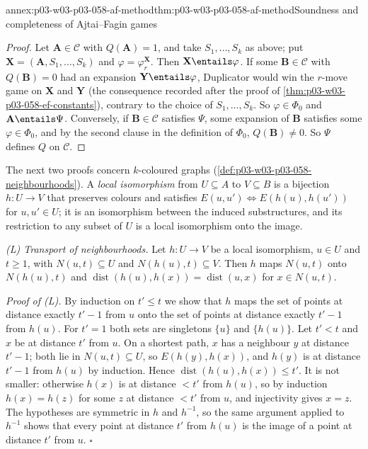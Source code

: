 \begin{annexitem}{annex:p03-w03-p03-058-af-method}{thm:p03-w03-p03-058-af-method}{Soundness and completeness of Ajtai--Fagin games}
\begin{proof}
Let \(\mathbf A\in\mathcal C\) with \(Q(\mathbf A)=1\), and take
\(S_1,\ldots,S_k\) as above; put \(\mathbf X=(\mathbf A,S_1,\ldots,S_k)\)
and \(\varphi=\varphi^{\mathbf X}_r\). Then \(\mathbf X\entails\varphi\).
If some \(\mathbf B\in\mathcal C\) with \(Q(\mathbf B)=0\) had an expansion
\(\mathbf Y\entails\varphi\), Duplicator would win the \(r\)-move game on
\(\mathbf X\) and \(\mathbf Y\) (the consequence recorded after
the proof of \cref{thm:p03-w03-p03-058-ef-constants}), contrary to the choice of
\(S_1,\ldots,S_k\). So \(\varphi\in\Phi_0\) and \(\mathbf A\entails\Psi\).
Conversely, if \(\mathbf B\in\mathcal C\) satisfies \(\Psi\), some expansion
of \(\mathbf B\) satisfies some \(\varphi\in\Phi_0\), and by the second
clause in the definition of \(\Phi_0\), \(Q(\mathbf B)\ne0\). So \(\Psi\)
defines \(Q\) on \(\mathcal C\).
\end{proof}
\end{annexitem}

The next two proofs concern \(k\)-coloured graphs
(\cref{def:p03-w03-p03-058-neighbourhoods}). A \emph{local isomorphism}
from \(U\subseteq A\) to \(V\subseteq B\) is a bijection \(h\colon U\to V\)
that preserves colours and satisfies \(E(u,u')\iff E(h(u),h(u'))\) for
\(u,u'\in U\); it is an isomorphism between the induced substructures, and
its restriction to any subset of \(U\) is a local isomorphism onto the
image.

\emph{(L) Transport of neighbourhoods.} Let \(h\colon U\to V\) be a local
isomorphism, \(u\in U\) and \(t\ge1\), with \(N(u,t)\subseteq U\) and
\(N(h(u),t)\subseteq V\). Then \(h\) maps \(N(u,t)\) onto \(N(h(u),t)\) and
\(\operatorname{dist}(h(u),h(x))=\operatorname{dist}(u,x)\) for
\(x\in N(u,t)\).

\emph{Proof of (L).} By induction on \(t'\le t\) we show that \(h\) maps
the set of points at distance exactly \(t'-1\) from \(u\) onto the set of
points at distance exactly \(t'-1\) from \(h(u)\). For \(t'=1\) both sets
are singletons \(\{u\}\) and \(\{h(u)\}\). Let \(t'<t\) and \(x\) be at
distance \(t'\) from \(u\). On a shortest path, \(x\) has a neighbour
\(y\) at distance \(t'-1\); both lie in \(N(u,t)\subseteq U\), so
\(E(h(y),h(x))\), and \(h(y)\) is at distance \(t'-1\) from \(h(u)\) by
induction. Hence \(\operatorname{dist}(h(u),h(x))\le t'\). It is not
smaller: otherwise \(h(x)\) is at distance \(<t'\) from \(h(u)\), so by
induction \(h(x)=h(z)\) for some \(z\) at distance \(<t'\) from \(u\), and
injectivity gives \(x=z\). The hypotheses are symmetric in \(h\) and
\(h^{-1}\), so the same argument applied to \(h^{-1}\) shows that every point
at distance \(t'\) from \(h(u)\) is the image of a point at distance \(t'\)
from \(u\). \qquad\(\square\)

